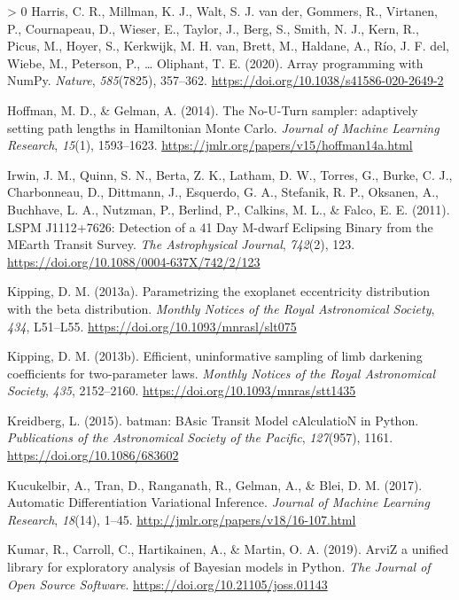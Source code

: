 \documentclass[10pt,a4paper,onecolumn]{article}
\newlength{\cslhangindent}
\newenvironment{CSLReferences}[3] %
 {%
  \setlength{\parindent}{0pt}
  \ifodd #1 \everypar{\setlength{\hangindent}{\cslhangindent}}\ignorespaces\fi
  \ifnum #2 > 0
  \setlength{\parskip}{#2\baselineskip}
  \fi
 }%
 {}
\begin{document}
\begin{CSLReferences}{1}{0}
\leavevmode\hypertarget{ref-numpy}{}%
Harris, C. R., Millman, K. J., Walt, S. J. van der, Gommers, R.,
Virtanen, P., Cournapeau, D., Wieser, E., Taylor, J., Berg, S., Smith,
N. J., Kern, R., Picus, M., Hoyer, S., Kerkwijk, M. H. van, Brett, M.,
Haldane, A., Río, J. F. del, Wiebe, M., Peterson, P., \ldots{} Oliphant,
T. E. (2020). Array programming with {NumPy}. \emph{Nature},
\emph{585}(7825), 357--362.
\url{https://doi.org/10.1038/s41586-020-2649-2}

\leavevmode\hypertarget{ref-hoffman14}{}%
Hoffman, M. D., \& Gelman, A. (2014). {The No-U-Turn sampler: adaptively
setting path lengths in Hamiltonian Monte Carlo}. \emph{Journal of
Machine Learning Research}, \emph{15}(1), 1593--1623.
\url{https://jmlr.org/papers/v15/hoffman14a.html}

\leavevmode\hypertarget{ref-irwin11}{}%
Irwin, J. M., Quinn, S. N., Berta, Z. K., Latham, D. W., Torres, G.,
Burke, C. J., Charbonneau, D., Dittmann, J., Esquerdo, G. A., Stefanik,
R. P., Oksanen, A., Buchhave, L. A., Nutzman, P., Berlind, P., Calkins,
M. L., \& Falco, E. E. (2011). {LSPM J1112+7626: Detection of a 41 Day
M-dwarf Eclipsing Binary from the MEarth Transit Survey}. \emph{The
Astrophysical Journal}, \emph{742}(2), 123.
\url{https://doi.org/10.1088/0004-637X/742/2/123}

\leavevmode\hypertarget{ref-kipping13b}{}%
Kipping, D. M. (2013a). {Parametrizing the exoplanet eccentricity
distribution with the beta distribution.} \emph{Monthly Notices of the
Royal Astronomical Society}, \emph{434}, L51--L55.
\url{https://doi.org/10.1093/mnrasl/slt075}

\leavevmode\hypertarget{ref-kipping13}{}%
Kipping, D. M. (2013b). {Efficient, uninformative sampling of limb
darkening coefficients for two-parameter laws}. \emph{Monthly Notices of
the Royal Astronomical Society}, \emph{435}, 2152--2160.
\url{https://doi.org/10.1093/mnras/stt1435}

\leavevmode\hypertarget{ref-kreidberg15}{}%
Kreidberg, L. (2015). {batman: BAsic Transit Model cAlculatioN in
Python}. \emph{Publications of the Astronomical Society of the Pacific},
\emph{127}(957), 1161. \url{https://doi.org/10.1086/683602}

\leavevmode\hypertarget{ref-kucukelbir17}{}%
Kucukelbir, A., Tran, D., Ranganath, R., Gelman, A., \& Blei, D. M.
(2017). {Automatic Differentiation Variational Inference}. \emph{Journal
of Machine Learning Research}, \emph{18}(14), 1--45.
\url{http://jmlr.org/papers/v18/16-107.html}

\leavevmode\hypertarget{ref-arviz}{}%
Kumar, R., Carroll, C., Hartikainen, A., \& Martin, O. A. (2019).
{ArviZ} a unified library for exploratory analysis of {Bayesian} models
in {Python}. \emph{The Journal of Open Source Software}.
\url{https://doi.org/10.21105/joss.01143}


\end{CSLReferences}
\end{document}
